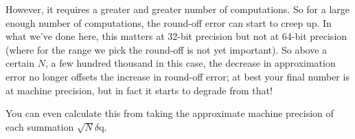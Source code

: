 However, it requires a greater and greater number of computations. So
for a large enough number of computations, the round-off error can
start to creep up. In what we've done here, this matters at 32-bit
precision but not at 64-bit precision (where for the range we pick the
round-off is not yet important). So above a certain $N$, a few hundred
thousand in this case, the decrease in approximation error no longer
offsets the increase in round-off error; at best your final number is
at machine precision, but in fact it starts to degrade from that!

You can even calculate this from taking the approximate machine
precision of each summation $\sqrt{N}\delta$q. 

